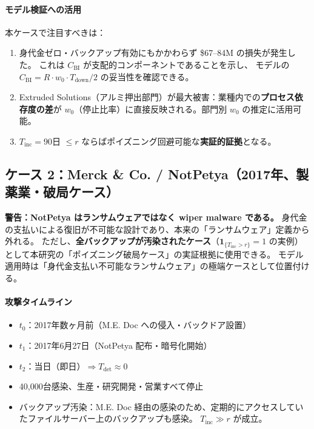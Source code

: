 \documentclass[a4paper,11pt]{article}
\newcommand{\ind}{\mathbf{1}}
\theoremstyle{definition}
\begin{document}
\paragraph{モデル検証への活用}

本ケースで注目すべきは：
\begin{enumerate}[leftmargin=1.5em, itemsep=2pt]
  \item 身代金ゼロ・バックアップ有効にもかかわらず \$67--84M の損失が発生した。
  これは $C_{\mathrm{BI}}$ が支配的コンポーネントであることを示し、
  モデルの $C_{\mathrm{BI}} = R \cdot w_0 \cdot T_{\mathrm{down}}/2$ の妥当性を確認できる。
  \item Extruded Solutions（アルミ押出部門）が最大被害：業種内での\textbf{プロセス依存度の差}が
  $w_0$（停止比率）に直接反映される。部門別 $w_0$ の推定に活用可能。
  \item $T_{\mathrm{inc}} = 90$日 $\leq r$ ならばポイズニング回避可能な\textbf{実証的証拠}となる。
\end{enumerate}

\subsection{ケース 2：Merck \& Co. / NotPetya（2017年、製薬業・破局ケース）}

\begin{tcolorbox}[warningbox]
  \textbf{警告：NotPetya はランサムウェアではなく wiper malware である。}
  身代金の支払いによる復旧が不可能な設計であり、本来の「ランサムウェア」定義から外れる。
  ただし、\textbf{全バックアップが汚染されたケース}（$\ind_{\{T_{\mathrm{inc}} > r\}} = 1$ の実例）
  として本研究の「ポイズニング破局ケース」の実証根拠に使用できる。
  モデル適用時は「身代金支払い不可能なランサムウェア」の極端ケースとして位置付ける。
\end{tcolorbox}

\paragraph{攻撃タイムライン}
\begin{itemize}[leftmargin=1.5em, itemsep=2pt]
  \item $t_0$：2017年数ヶ月前（M.E. Doc への侵入・バックドア設置）
  \item $t_1$：2017年6月27日（NotPetya 配布・暗号化開始）
  \item $t_2$：当日（即日）$\Rightarrow T_{\mathrm{det}} \approx 0$
  \item 40,000台感染、生産・研究開発・営業すべて停止
  \item バックアップ汚染：M.E. Doc 経由の感染のため、定期的にアクセスしていたファイルサーバー上のバックアップも感染。
    $T_{\mathrm{inc}} \gg r$ が成立。
\end{itemize}
\end{document}

